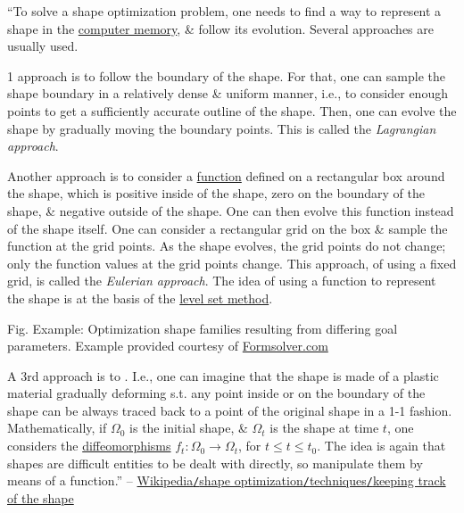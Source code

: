 \documentclass[oneside]{book}
\numberwithin{equation}{section}
\begin{document}
``To solve a shape optimization problem, one needs to find a way to represent a shape in the \href{https://en.wikipedia.org/wiki/Computer_memory}{computer memory}, \& follow its evolution. Several approaches are usually used.

1 approach is to follow the boundary of the shape. For that, one can sample the shape boundary in a relatively dense \& uniform manner, i.e., to consider enough points to get a sufficiently accurate outline of the shape. Then, one can evolve the shape by gradually moving the boundary points. This is called the \textit{Lagrangian approach}.

Another approach is to consider a \href{https://en.wikipedia.org/wiki/Function_(mathematics)}{function} defined on a rectangular box around the shape, which is positive inside of the shape, zero on the boundary of the shape, \& negative outside of the shape. One can then evolve this function instead of the shape itself. One can consider a rectangular grid on the box \& sample the function at the grid points. As the shape evolves, the grid points do not change; only the function values at the grid points change. This approach, of using a fixed grid, is called the \textit{Eulerian approach}. The idea of using a function to represent the shape is at the basis of the \href{https://en.wikipedia.org/wiki/Level-set_method}{level set method}.

\textsf{Fig. Example: Optimization shape families resulting from differing goal parameters. Example provided courtesy of \url{Formsolver.com}}

A 3rd approach is to . I.e., one can imagine that the shape is made of a plastic material gradually deforming s.t. any point inside or on the boundary of the shape can be always traced back to a point of the original shape in a 1-1 fashion. Mathematically, if $\Omega_0$ is the initial shape, \& $\Omega_t$ is the shape at time $t$, one considers the \href{https://en.wikipedia.org/wiki/Diffeomorphism}{diffeomorphisms} $f_t:\Omega_0\to\Omega_t$, for $t\le t\le t_0$. The idea is again that shapes are difficult entities to be dealt with directly, so manipulate them by means of a function.'' -- \href{https://en.wikipedia.org/wiki/Shape_optimization#Keeping_track_of_the_shape}{Wikipedia\texttt{/}shape optimization\texttt{/}techniques\texttt{/}keeping track of the shape}
\end{document}
